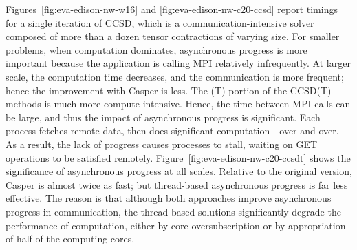 Figures~\ref{fig:eva-edison-nw-w16} and
\ref{fig:eva-edison-nw-c20-ccsd} report timings for a single
iteration of CCSD, which is a communication-intensive solver composed
of more than a dozen tensor contractions of varying size.  For smaller
problems, when computation dominates, asynchronous progress is more
important because the application is calling MPI relatively
infrequently.  At larger scale, the computation time decreases, and the
communication is more frequent; hence the improvement with Casper is
less.  The (T) portion of the CCSD(T) methods is much more
compute-intensive. Hence, the time between MPI calls can be
large, and thus the impact of asynchronous progress is
significant.  Each process fetches remote data, then does significant
computation---over and over. As a result, the lack of progress causes
processes to stall, waiting on GET operations to be satisfied remotely.
Figure~\ref{fig:eva-edison-nw-c20-ccsdt} shows the significance of
asynchronous progress at all scales.  Relative to the original
version, Casper is almost twice as fast; but thread-based asynchronous
progress is far less effective. The reason is that although both approaches
improve asynchronous progress in communication, the thread-based
solutions significantly degrade the performance of computation, either by
core oversubscription or by appropriation of half of the computing cores.

